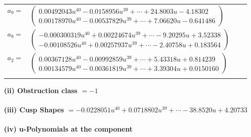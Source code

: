 \documentclass[1p]{elsarticle_modified}
\theoremstyle{definition}
\begin{document}
\begin{tabular}{m{7pt} m{180pt} m{7pt} m{180pt} }
\flushright $a_{9}=$&$\begin{pmatrix}0.00492043 u^{40}-0.0158956 u^{39}+\cdots+24.8003 u-4.18302\\0.00178970 u^{40}-0.00537829 u^{39}+\cdots+7.06620 u-0.641486\end{pmatrix}$ \\
\flushright $a_{8}=$&$\begin{pmatrix}-0.000300319 u^{40}+0.00224674 u^{39}+\cdots-9.20295 u+3.52338\\-0.00108526 u^{40}+0.00257937 u^{39}+\cdots-2.40758 u+0.183564\end{pmatrix}$ \\
\flushright $a_{2}=$&$\begin{pmatrix}0.00367128 u^{40}-0.00992859 u^{39}+\cdots+5.43318 u+0.814239\\0.00134579 u^{40}-0.00361819 u^{39}+\cdots+3.39304 u+0.0150160\end{pmatrix}$\\&\end{tabular}
\flushleft \textbf{(ii) Obstruction class $= -1$}\\~\\
\flushleft \textbf{(iii) Cusp Shapes $= -0.0228051 u^{40}+0.0718802 u^{39}+\cdots-38.8520 u+4.20733$}\\~\\
\newpage\renewcommand{\arraystretch}{1}
\flushleft \textbf{(iv) u-Polynomials at the component}\newline \\
\end{document}
